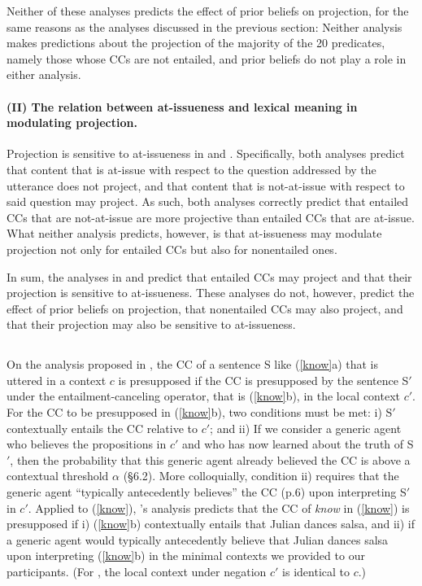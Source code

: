 \documentclass[11pt,fleqn]{article}
\newcommand{\6}{\mbox{$[\hspace*{-.6mm}[$}}
\newcommand{\9}{\mbox{$]\hspace*{-.6mm}]$}}
\newcommand{\citepos}[1]{\citeauthor{#1}'s \citeyear{#1}}
\begin{document}
Neither of these analyses predicts the effect of prior beliefs on projection, for the same reasons as the analyses discussed in the previous section: Neither analysis makes predictions about the projection of the majority of the 20 predicates, namely those whose CCs are not entailed, and prior beliefs do not play a role in either analysis.

\paragraph{(II) The relation between at-issueness and lexical meaning in modulating projection.}

Projection is sensitive to at-issueness in \citealt{abrusan2011,abrusan2016} and \citealt{best-question}. Specifically, both analyses predict that content that is at-issue with respect to the question addressed by the utterance does not project, and that content that is not-at-issue with respect to said question may project. As such, both analyses correctly predict that entailed CCs that are not-at-issue are more projective than entailed CCs that are at-issue. What neither analysis predicts, however, is that at-issueness may modulate projection not only for entailed CCs but also for nonentailed ones. 

\bigskip

In sum, the analyses in \citealt{abrusan2011,abrusan2016} and \citealt{best-question} predict that entailed CCs may project and that their projection is sensitive to at-issueness.  These analyses do not, however, predict the effect of prior beliefs on projection, that nonentailed CCs may also project, and that their projection may also be sensitive to at-issueness.

\subsection{\citealt{schlenker2021}}

On the analysis proposed in \citealt{schlenker2021}, the CC of a sentence S like (\ref{know}a) that is uttered in a context $c$ is presupposed if the CC is presupposed by the sentence S$'$under the entailment-canceling operator, that is (\ref{know}b), in the local context $c'$. For the CC to be presupposed in (\ref{know}b), two conditions must be met: i) S$'$ contextually entails the CC relative to $c'$; and ii) If we consider a generic agent who believes the propositions in $c'$ and who has now learned about the truth of S$'$, then the probability that this generic agent already believed the CC is above a contextual threshold $\alpha$ (\S6.2). More colloquially, condition ii) requires that the generic agent ``typically antecedently believes'' the CC (p.6) upon interpreting S$'$ in $c'$. Applied to (\ref{know}), \citepos{schlenker2021} analysis predicts that the CC of \emph{know} in (\ref{know})  is presupposed if i) (\ref{know}b) contextually entails that Julian dances salsa, and ii) if a generic agent would typically antecedently believe that Julian dances salsa upon interpreting (\ref{know}b) in the minimal contexts we provided to our participants. (For \citealt{schlenker2021}, the local context under negation $c'$ is identical to $c$.)
\end{document}

